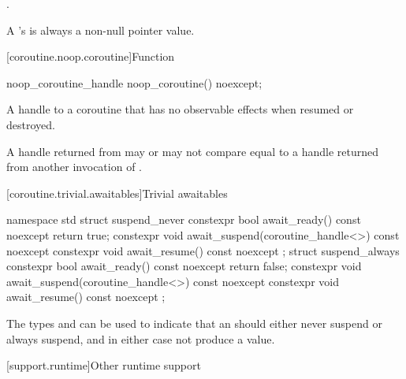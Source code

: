 \begin{itemdescr}
\pnum \returns {}.

\pnum \remarks A 's  is always a
non-null pointer value.
\end{itemdescr}

[coroutine.noop.coroutine]{Function }

%
\begin{itemdecl}
noop_coroutine_handle noop_coroutine() noexcept;
\end{itemdecl}

\begin{itemdescr}
\pnum \returns A handle to a coroutine that has no observable effects
when resumed or destroyed.

\pnum \remarks A handle returned from  may or may not
compare equal to a handle returned from another invocation
of .
\end{itemdescr}

[coroutine.trivial.awaitables]{Trivial awaitables}

%
%
%
%
%
%
%
%
\begin{codeblock}
namespace std {
  struct suspend_never {
    constexpr bool await_ready() const noexcept { return true; }
    constexpr void await_suspend(coroutine_handle<>) const noexcept {}
    constexpr void await_resume() const noexcept {}
  };
  struct suspend_always {
    constexpr bool await_ready() const noexcept { return false; }
    constexpr void await_suspend(coroutine_handle<>) const noexcept {}
    constexpr void await_resume() const noexcept {}
  };
}
\end{codeblock}

\pnum
\begin{note}
The types  and  can be used
to indicate that an  should either never
suspend or always suspend, and in either case not produce a value.
\end{note}

[support.runtime]{Other runtime support}

